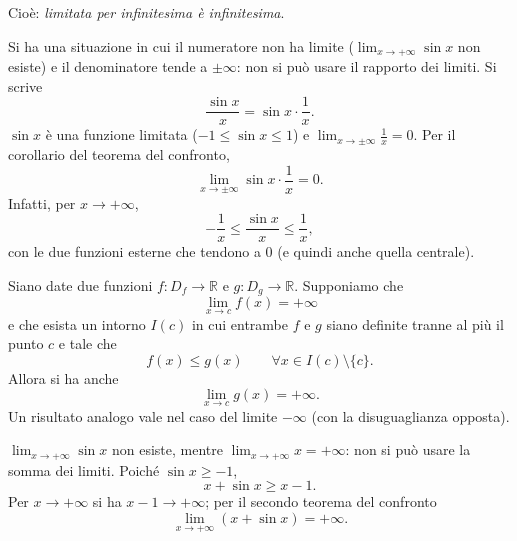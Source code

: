 \documentclass[11pt,a4paper]{article}
\begin{document}
Cioè: \emph{limitata per infinitesima è infinitesima}.

\begin{esempio}
Si ha una situazione in cui il numeratore non ha limite ($\lim_{x\to+\infty}\sin x$ non esiste) e il denominatore tende a $\pm\infty$: non si può usare il rapporto dei limiti. Si scrive
\[
  \frac{\sin x}{x} = \sin x\cdot\frac{1}{x}.
\]
$\sin x$ è una funzione limitata ($-1 \le \sin x \le 1$) e $\lim_{x\to\pm\infty}\frac{1}{x} = 0$. Per il corollario del teorema del confronto,
\[
  \lim_{x\to\pm\infty}\sin x\cdot\frac{1}{x} = 0.
\]
Infatti, per $x \to +\infty$,
\[
  -\frac{1}{x} \le \frac{\sin x}{x} \le \frac{1}{x},
\]
con le due funzioni esterne che tendono a $0$ (e quindi anche quella centrale).
\end{esempio}

\begin{teorema}
Siano date due funzioni $f : D_f \to \mathbb{R}$ e $g : D_g \to \mathbb{R}$. Supponiamo che
\[
  \lim_{x\to c} f(x) = +\infty
\]
e che esista un intorno $I(c)$ in cui entrambe $f$ e $g$ siano definite tranne al più il punto $c$ e tale che
\[
  f(x) \le g(x) \qquad \forall x \in I(c)\setminus\{c\}.
\]
Allora si ha anche
\[
  \lim_{x\to c} g(x) = +\infty.
\]
Un risultato analogo vale nel caso del limite $-\infty$ (con la disuguaglianza opposta).
\end{teorema}

\begin{esempio}
$\lim_{x\to+\infty}\sin x$ non esiste, mentre $\lim_{x\to+\infty} x = +\infty$: non si può usare la somma dei limiti. Poiché $\sin x \ge -1$,
\[
  x + \sin x \ge x - 1 .
\]
Per $x \to +\infty$ si ha $x - 1 \to +\infty$; per il secondo teorema del confronto
\[
  \lim_{x\to+\infty}(x + \sin x) = +\infty.
\]
\end{esempio}
\end{document}
